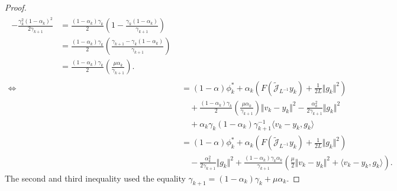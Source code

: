 \documentclass[12pt]{article}
\begin{document}
\begin{proof}
\begin{align*}
{\begin{aligned}
                    - 
                    \frac{\gamma_k^2(1 - \alpha_k)^2}{2\gamma_{k + 1}}   
                    &= 
                    \frac{(1 - \alpha_k)\gamma_k}{2}
                    \left(
                        1 - \frac{\gamma_k (1 - \alpha_k)}{\gamma_{k + 1}}
                    \right)
                    \\
                    &= 
                    \frac{(1 - \alpha_k)\gamma_k}{2}
                    \left(
                        \frac{\gamma_{k + 1} - \gamma_k(1 - \alpha_k)}{\gamma_{k + 1}}
                    \right)
                    \\
                    &= 
                    \frac{(1 - \alpha_k)\gamma_k}{2}
                    \left(
                        \frac{\mu \alpha_k}{\gamma_{k + 1}}
                    \right). 
                \end{aligned}
            }
            \\
            \iff 
            &= 
                (1 - \alpha)\phi_k^* + 
                \alpha_k
                \left(
                    F\left(\widetilde{\mathcal J}_{L^{-1}} y_k\right) + 
                    \frac{1}{2L}\Vert g_k\Vert^2
                \right)
                \\
                &\quad 
                + 
                \frac{(1 - \alpha_k)\gamma_k}{2}
                \left(
                    \frac{\mu \alpha_k}{\gamma_{k + 1}}
                \right)
                \Vert v_k - y_k\Vert^2
                - \frac{\alpha_k^2}{2\gamma_{k + 1}}\Vert g_k\Vert^2
                \\
                & \quad 
                + \alpha_k\gamma_k(1 - \alpha_k)\gamma_{k + 1}^{-1}\langle v_k -y_k, g_k\rangle
            \\
            &= 
                (1 - \alpha)\phi_k^* 
                + 
                \alpha_k
                \left(
                    F\left(\widetilde{\mathcal J}_{L^{-1}} y_k\right) + 
                    \frac{1}{2L}\Vert g_k\Vert^2
                \right)
                \\
                &\quad 
                - 
                \frac{\alpha_k^2}{2\gamma_{k + 1}}\Vert g_k\Vert^2
                + 
                \frac{(1 - \alpha_k)\gamma_k\alpha_k}{\gamma_{k + 1}}
                \left(
                    \frac{\mu}{2}\Vert v_k - y_k\Vert^2
                    + \langle v_k - y_k, g_k\rangle
                \right). 
        \end{align*}
        The second and third inequality used the equality $\gamma_{k + 1} = (1 - \alpha_k)\gamma_k + \mu \alpha_k$. 
    \end{proof}
    
\end{document}
